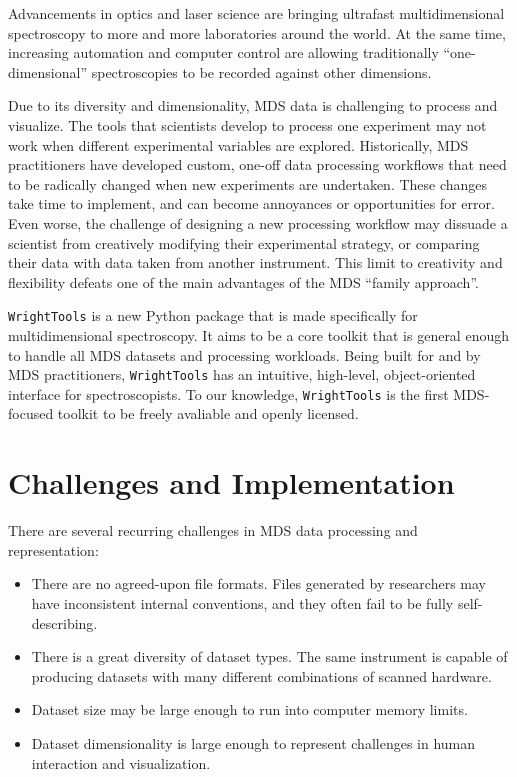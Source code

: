 Advancements in optics and laser science are bringing ultrafast
multidimensional spectroscopy to more and more laboratories around the
world. At the same time, increasing automation and computer control are
allowing traditionally ``one-dimensional'' spectroscopies to be recorded
against other dimensions.

Due to its diversity and dimensionality, MDS data is challenging to
process and visualize. The tools that scientists develop to process one
experiment may not work when different experimental variables are
explored. Historically, MDS practitioners have developed custom, one-off
data processing workflows that need to be radically changed when new
experiments are undertaken. These changes take time to implement, and
can become annoyances or opportunities for error. Even worse, the
challenge of designing a new processing workflow may dissuade a
scientist from creatively modifying their experimental strategy, or
comparing their data with data taken from another instrument. This limit
to creativity and flexibility defeats one of the main advantages of the
MDS ``family approach''.

\texttt{WrightTools} is a new Python package that is made specifically
for multidimensional spectroscopy. It aims to be a core toolkit that is
general enough to handle all MDS datasets and processing workloads.
Being built for and by MDS practitioners, \texttt{WrightTools} has an
intuitive, high-level, object-oriented interface for spectroscopists. To
our knowledge, \texttt{WrightTools} is the first MDS-focused toolkit to
be freely avaliable and openly licensed.

\hypertarget{challenges-and-implementation}{%
\section{Challenges and
Implementation}\label{challenges-and-implementation}}

There are several recurring challenges in MDS data processing and
representation:

\begin{itemize}
\tightlist
\item
  There are no agreed-upon file formats. Files generated by researchers
  may have inconsistent internal conventions, and they often fail to be
  fully self-describing.
\item
  There is a great diversity of dataset types. The same instrument is
  capable of producing datasets with many different combinations of
  scanned hardware.
\item
  Dataset size may be large enough to run into computer memory limits.
\item
  Dataset dimensionality is large enough to represent challenges in
  human interaction and visualization.
\end{itemize}

